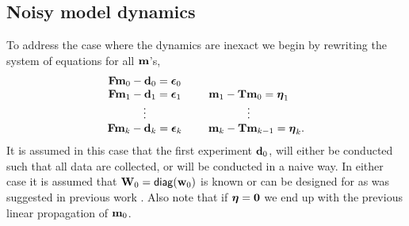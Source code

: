 \documentclass[11pt]{article}
\newcommand{\bfF}	{{\bf{F}}}
\newcommand{\bfT}	{{\bf{T}}}
\newcommand{\bfW}	{{\bf{W}}}
\newcommand{\bfd}	{{\bf{d}}}
\newcommand{\bfm}	{{\bf{m}}}
\newcommand{\bfw}	{{\bf{w}}}
\newcommand{\bfepsilon} {{\boldsymbol \epsilon}}
\newcommand{\bfeta}     {{\boldsymbol \eta}}
\newcommand {\zero}  { {\bf 0} }
\begin{document}
\subsection{Noisy model dynamics}
\label{sec:Noisy}

To address the case where the dynamics are inexact we begin by  
rewriting the system of equations for all  $\bfm$'s,
\begin{align*}
\label{eq:noisy}
\begin{array}{cc}
\bfF\bfm_{0} - \bfd_0 = \bfepsilon_0 & \\
\bfF\bfm_{1} - \bfd_1 = \bfepsilon_1 & \bfm_1 -\bfT\bfm_0 = \bfeta_1 \\
\vdots & \vdots \\
\bfF\bfm_{k} - \bfd_k = \bfepsilon_k &  \;\;\;\;\;\bfm_k -\bfT\bfm_{k-1} = \bfeta_k.
\end{array}
\end{align*} 
It is  assumed in this case that the first experiment $\bfd_0$, will either be conducted such that all data are collected,  or will be conducted in a naive way.  In either case it is assumed that $\bfW_0 = {\sf diag}(\bfw_0)$ is known
or can be designed for as was suggested in previous work \cite{Haber2011}.
Also note that if $\bfeta = \zero$ we end up with the previous linear propagation of $\bfm_{0}$. 
\end{document}
